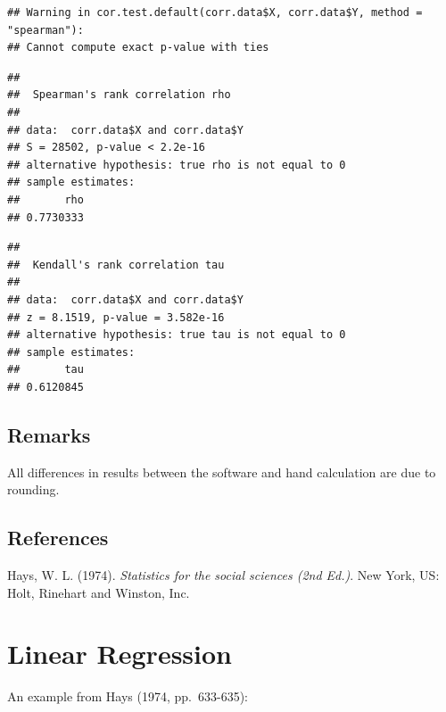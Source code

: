 \documentclass[
]{book}
\newenvironment{Shaded}{\begin{snugshade}}{\end{snugshade}}
\newcommand{\DataTypeTok}[1]{\textcolor[rgb]{0.13,0.29,0.53}{#1}}
\newcommand{\KeywordTok}[1]{\textcolor[rgb]{0.13,0.29,0.53}{\textbf{#1}}}
\newcommand{\NormalTok}[1]{#1}
\newcommand{\OperatorTok}[1]{\textcolor[rgb]{0.81,0.36,0.00}{\textbf{#1}}}
\newcommand{\StringTok}[1]{\textcolor[rgb]{0.31,0.60,0.02}{#1}}
\begin{document}
\begin{verbatim}
## Warning in cor.test.default(corr.data$X, corr.data$Y, method = "spearman"):
## Cannot compute exact p-value with ties
\end{verbatim}

\begin{verbatim}
## 
## 	Spearman's rank correlation rho
## 
## data:  corr.data$X and corr.data$Y
## S = 28502, p-value < 2.2e-16
## alternative hypothesis: true rho is not equal to 0
## sample estimates:
##       rho 
## 0.7730333
\end{verbatim}

\begin{Shaded}
\end{Shaded}

\begin{verbatim}
## 
## 	Kendall's rank correlation tau
## 
## data:  corr.data$X and corr.data$Y
## z = 8.1519, p-value = 3.582e-16
## alternative hypothesis: true tau is not equal to 0
## sample estimates:
##       tau 
## 0.6120845
\end{verbatim}

\hypertarget{remarks}{%
\subsection{Remarks}\label{remarks}}

All differences in results between the software and hand calculation are due to rounding.

\hypertarget{references}{%
\subsection{References}\label{references}}

Hays, W. L. (1974). \emph{Statistics for the social sciences (2nd Ed.)}. New York, US: Holt, Rinehart and Winston, Inc.

\hypertarget{linear-regression}{%
\section{Linear Regression}\label{linear-regression}}

An example from Hays (1974, pp.~633-635):
\end{document}

